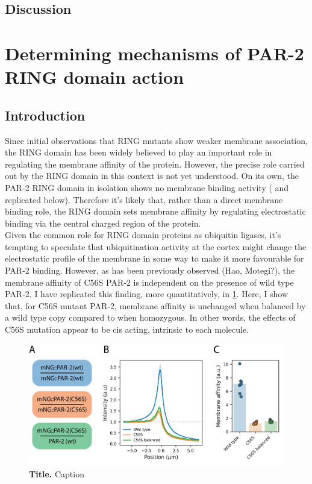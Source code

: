 \documentclass[12pt]{"article"}
\newcommand{\mycaption}[2]{\caption[#1]{\textbf{#1.} #2}}
\begin{document}
\clearpage
\subsection{Discussion}

\clearpage
\section{Determining mechanisms of PAR-2 RING domain action}

\subsection{Introduction}


Since initial observations that RING mutants show weaker membrane association, the RING domain has been widely believed to play an important role in regulating the membrane affinity of the protein. However, the precise role carried out by the RING domain in this context is not yet understood. On its own, the PAR-2 RING domain in isolation shows no membrane binding activity (\cite{Hao2006} and replicated below). Therefore it's likely that, rather than a direct membrane binding role, the RING domain sets membrane affinity by regulating electrostatic binding via the central charged region of the protein.\\

Given the common role for RING domain proteins as ubiquitin ligases, it's tempting to speculate that ubiquitination activity at the cortex might change the electrostatic profile of the membrane in some way to make it more favourable for PAR-2 binding. However, as has been previously observed (Hao, Motegi?), the membrane affinity of C56S PAR-2 is independent on the presence of wild type PAR-2. I have replicated this finding, more quantitatively, in \cref{fig:c56s_cis}. Here, I show that, for C56S mutant PAR-2, membrane affinity is unchanged when balanced by a wild type copy compared to when homozygous. In other words, the effects of C56S mutation appear to be cis acting, intrinsic to each molecule.

\begin{figure}[!h]
\includegraphics[scale=1]{c56s_cis}
\setlength{\abovecaptionskip}{20pt}
\centering
\mycaption{Title}{Caption}
\label{fig:c56s_cis}
\end{figure}
\end{document}
